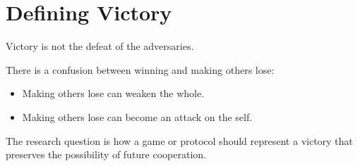 \chapter{Defining Victory}
\label{chap:defining-victory}


Victory is not the defeat of the adversaries.

There is a confusion between winning and making others lose:

\begin{itemize}
  \item Making others lose can weaken the whole.
  \item Making others lose can become an attack on the self.
\end{itemize}

The research question is how a game or protocol should represent a victory
that preserves the possibility of future cooperation.
